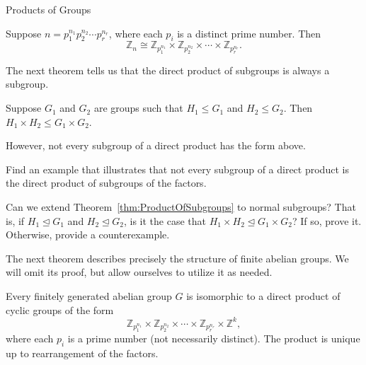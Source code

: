 \begin{section}{Products of Groups}
\begin{theorem}
Suppose $n=p_1^{n_1}p_2^{n_2}\cdots p_r^{n_r}$, where each $p_i$ is a distinct prime number.  Then
\[
\mathbb{Z}_n\cong \mathbb{Z}_{p_1^{n_1}}\times \mathbb{Z}_{p_2^{n_2}}\times \cdots \times \mathbb{Z}_{p_r^{n_r}}.
\]
\end{theorem}

The next theorem tells us that the direct product of subgroups is always a subgroup.

\begin{theorem}\label{thm:ProductOfSubgroups}
Suppose $G_1$ and $G_2$ are groups such that $H_1\leq G_1$ and $H_2\leq G_2$.  Then $H_1\times H_2\leq G_1\times G_2$.
\end{theorem}

However, not every subgroup of a direct product has the form above. 

\begin{problem}
Find an example that illustrates that not every subgroup of a direct product is the direct product of subgroups of the factors.
\end{problem}

\begin{problem}
Can we extend Theorem~\ref{thm:ProductOfSubgroups} to normal subgroups?  That is, if $H_1\trianglelefteq G_1$ and $H_2\trianglelefteq G_2$, is it the case that $H_1\times H_2\trianglelefteq G_1\times G_2$? If so, prove it.  Otherwise, provide a counterexample.
\end{problem}


The next theorem describes precisely the structure of finite abelian groups.  We will omit its proof, but allow ourselves to utilize it as needed.

\begin{theorem}
Every finitely generated abelian group $G$ is isomorphic to a direct product of cyclic groups of the form
\[
\mathbb{Z}_{p_1^{n_1}}\times \mathbb{Z}_{p_2^{n_2}}\times \cdots \times \mathbb{Z}_{p_r^{n_r}}\times \mathbb{Z}^k,
\]
where each $p_i$ is a prime number (not necessarily distinct).  The product is unique up to rearrangement of the factors.
\end{theorem}


\end{section}
